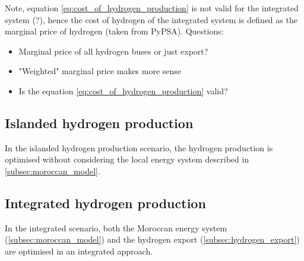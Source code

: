 Note, equation \ref{eq:cost_of_hydrogen_production} is not valid for the integrated system (?),
hence the cost of hydrogen of the integrated system is defined as the marginal price of hydrogen (taken from PyPSA).
Questions:
\begin{itemize}
    \item Marginal price of all hydrogen buses or just export?
    \item "Weighted" marginal price makes more sense
    \item Is the equation \ref{eq:cost_of_hydrogen_production} valid?
\end{itemize}


\subsection{Islanded hydrogen production}
In the islanded hydrogen production scenario, the hydrogen production is optimised without considering the local energy system described in \ref{subsec:moroccan_model}.


\subsection{Integrated hydrogen production}
In the integrated scenario, both the Moroccan energy system (\ref{subsec:moroccan_model}) and the hydrogen export (\ref{subsec:hydrogen_export})
are optimised in an integrated approach.